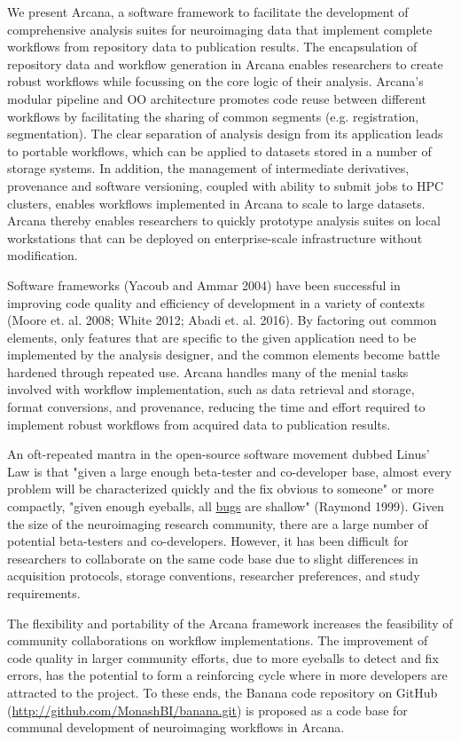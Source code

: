 We present Arcana, a software framework to facilitate the development of
comprehensive analysis suites for neuroimaging data that implement
complete workflows from repository data to publication results. The
encapsulation of repository data and workflow generation in Arcana
enables researchers to create robust workflows while focussing on the
core logic of their analysis. Arcana's modular pipeline and OO
architecture promotes code reuse between different workflows by
facilitating the sharing of common segments (e.g. registration,
segmentation). The clear separation of analysis design from its
application leads to portable workflows, which can be applied to
datasets stored in a number of storage systems. In addition, the
management of intermediate derivatives, provenance and software
versioning, coupled with ability to submit jobs to HPC clusters, enables
workflows implemented in Arcana to scale to large datasets. Arcana
thereby enables researchers to quickly prototype analysis suites on
local workstations that can be deployed on enterprise-scale
infrastructure without modification.

Software frameworks (Yacoub and Ammar 2004) have been successful in
improving code quality and efficiency of development in a variety of
contexts (Moore et. al. 2008; White 2012; Abadi et. al. 2016). By
factoring out common elements, only features that are specific to the
given application need to be implemented by the analysis designer, and
the common elements become battle hardened through repeated use. Arcana
handles many of the menial tasks involved with workflow implementation,
such as data retrieval and storage, format conversions, and provenance,
reducing the time and effort required to implement robust workflows from
acquired data to publication results.

An oft-repeated mantra in the open-source software movement dubbed
Linus' Law is that "given a large enough beta-tester and co-developer
base, almost every problem will be characterized quickly and the fix
obvious to someone" or more compactly, "given enough eyeballs, all
\href{https://en.wikipedia.org/wiki/Software_bug}{bugs} are shallow"
(Raymond 1999). Given the size of the neuroimaging research community,
there are a large number of potential beta-testers and co-developers.
However, it has been difficult for researchers to collaborate on the
same code base due to slight differences in acquisition protocols,
storage conventions, researcher preferences, and study requirements.

The flexibility and portability of the Arcana framework increases the
feasibility of community collaborations on workflow implementations. The
improvement of code quality in larger community efforts, due to more
eyeballs to detect and fix errors, has the potential to form a
reinforcing cycle where in more developers are attracted to the project.
To these ends, the Banana code repository on GitHub
(\url{http://github.com/MonashBI/banana.git}) is proposed as a code base
for communal development of neuroimaging workflows in Arcana.

